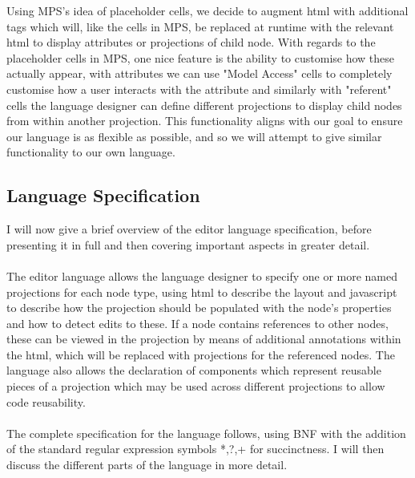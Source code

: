\documentclass{article}
\begin{document}
Using MPS's idea of placeholder cells, we decide to augment html with additional tags which will, like the cells in MPS, be replaced at runtime with the relevant html to display attributes or projections of child node. With regards to the placeholder cells in MPS, one nice feature is the ability to customise how these actually appear, with attributes we can use "Model Access" cells to completely customise how a user interacts with the attribute and similarly with "referent" cells the language designer can define different projections to display child nodes from within another projection. This functionality aligns with our goal to ensure our language is as flexible as possible, and so we will attempt to give similar functionality to our own language.

\subsection{Language Specification}
I will now give a brief overview of the editor language specification, before presenting it in full and then covering important aspects in greater detail. 
\\
\\
The editor language allows the language designer to specify one or more named projections for each node type, using html to describe the layout and javascript to describe how the projection should be populated with the node's properties and how to detect edits to these. If a node contains references to other nodes, these can be viewed in the projection by means of additional annotations within the html, which will be replaced with projections for the referenced nodes. The language also allows the declaration of components which represent reusable pieces of a projection which may be used across different projections to allow code reusability. 
\\
\\
The complete specification for the language follows, using BNF with the addition of the standard regular expression symbols *,?,+ for succinctness. I will then discuss the different parts of the language in more detail.

\setlength{\grammarparsep}{12pt plus 1pt minus 1pt} %
\setlength{\grammarindent}{5em} %
\end{document}
